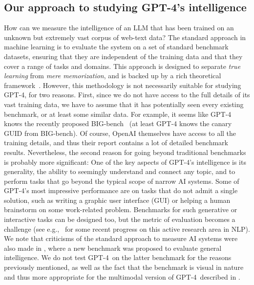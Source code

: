     \subsection{Our approach to studying GPT-4's intelligence} How can we measure the intelligence of an LLM that has been trained on an unknown but extremely vast corpus of web-text data? The standard approach in machine learning is to evaluate the system on a set of standard benchmark datasets, ensuring that they are independent of the training data and that they cover a range of tasks and domains. This approach is designed to separate {\em true learning} from {\em mere memorization}, and is backed up by a rich theoretical framework~\cite{shalev2014understanding, mohri2018foundations}. However, this methodology is not necessarily suitable for studying {GPT-4}, for two reasons. First, since we do not have access to the full details of its vast training data, we have to assume that it has potentially seen every existing benchmark, or at least some similar data. For example, it seems like {GPT-4} knows the recently proposed BIG-bench~\cite{srivastava2022beyond} (at least {GPT-4} knows the canary GUID from BIG-bench). Of course, OpenAI themselves have access to all the training details, and thus their report \cite{gpt4} contains a lot of detailed benchmark results. Nevertheless, the second reason for going beyond traditional benchmarks is probably more significant: One of the key aspects of GPT-4's intelligence is its generality, the ability to seemingly understand and connect any topic, and to perform tasks that go beyond the typical scope of narrow AI systems. Some of GPT-4's most impressive performance are on tasks that do not admit a single solution, such as writing a graphic user interface (GUI) or helping a human brainstorm on some work-related problem. Benchmarks for such generative or interactive tasks can be designed too, but the metric of evaluation becomes a challenge (see e.g.,~\cite{NEURIPS2021_260c2432} for some recent progress on this active research area in NLP). We note that criticisms of the standard approach to measure AI systems were also made in \cite{chollet2019measure}, where a new benchmark was proposed to evaluate general intelligence. We do not test GPT-4\ on the latter benchmark for the reasons previously mentioned, as well as the fact that the benchmark is visual in nature and thus more appropriate for the multimodal version of GPT-4\ described in \cite{gpt4}.

